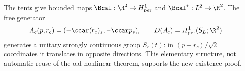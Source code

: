 The tents give bounded maps $\Bcal:\R^2\to H^1_{\rm per}$ and $\Bcal^*:L^2\to\R^2$. The free generator
\begin{equation}\label{eq:freegroup}
A_c(p,r_c)=(-\ccar(r_c)_s,-\ccar p_s),\qquad D(A_c)=H^1_{\rm per}(S_L;\R^2)
\end{equation}
generates a unitary strongly continuous group $S_c(t)$: in $(p\pm r_c)/\sqrt2$ coordinates it translates in opposite directions. This elementary structure, not automatic reuse of the old nonlinear theorem, supports the new existence proof.
